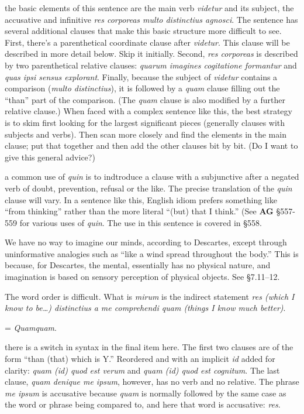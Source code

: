  the basic elements of this sentence are the main verb \textit{videtur} and its subject, the accusative and infinitive \textit{res corporeas multo distinctius agnosci}. The sentence has several additional clauses that make this basic structure more difficult to see. First, there's a parenthetical coordinate clause after \textit{videtur}. This clause will be described in more detail below. Skip it initially. Second, \textit{res corporeas} is described by two parenthetical relative clauses: \textit{quarum imagines cogitatione formantur} and \textit{quas ipsi sensus explorant}. Finally, because the subject of \textit{videtur} contains a comparison (\textit{multo distinctius}), it is followed by a \textit{quam} clause filling out the ``than'' part of the comparison. (The \textit{quam} clause is also modified by a further relative clause.) When faced with a complex sentence like this, the best strategy is to skim first looking for the largest significant pieces (generally clauses with subjects and verbs). Then scan more closely and find the elements in the main clause; put that together and then add the other clauses bit by bit. (Do I want to give this general advice?)

 a common use of \textit{quin} is to indtroduce a clause with a subjunctive after a negated verb of doubt, prevention, refusal or the like. The precise translation of the \textit{quin} clause will vary. In a sentence like this, English idiom prefers something like ``from thinking'' rather than the more literal ``(but) that I think.'' (See \textbf{AG} §557-559 for various uses of \textit{quin}. The use in this sentence is covered in §558.

 We have no way to imagine our minds, according to Descartes, except through uninformative analogies such as ``like a wind spread throughout the body.'' This is because, for Descartes, the mental, essentially has no physical nature, and imagination is based on sensory perception of physical objects. See §7.11--12.

 The word order is difficult. What is \textit{mirum} is the indirect statement \textit{res (which I know to be\dots) distinctius a me comprehendi quam (things I know much better)}.

 = \textit{Quamquam}.

 there is a switch in syntax in the final item here. The first two clauses are  of the form ``than (that) which is Y.'' Reordered and with an implicit \textit{id} added for clarity: \textit{quam (id) quod est verum} and \textit{quam (id) quod est cognitum}. The last clause, \textit{quam denique me ipsum}, however, has no verb and no relative. The phrase \textit{me ipsum} is accusative because \textit{quam} is normally followed by the same case as the word or phrase being compared to, and here that word is accusative: \textit{res}.


